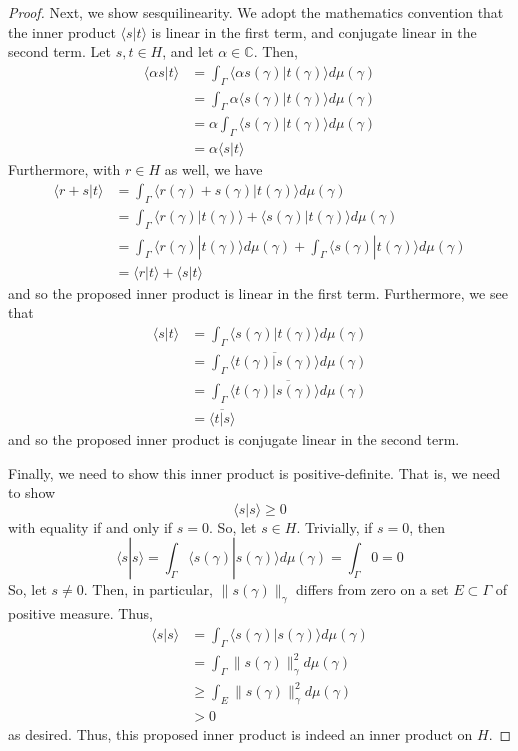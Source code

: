 \documentclass[fontsize=11pt]{scrartcl} %
\numberwithin{equation}{section} %
\numberwithin{figure}{section} %
\numberwithin{table}{section} %
\newcommand{\C}{\mathbb{C}}
\newcommand{\la}{\langle}
\newcommand{\ra}{\rangle}
\begin{document}
\begin{proof}
    Next, we show sesquilinearity. We adopt the mathematics convention that the
    inner product $\la s|t\ra$ is linear in the first term, and conjugate linear
    in the second term. Let $s,t\in H$, and let $\alpha\in \C$.
    Then,
    \[
        \begin{aligned}
        \la \alpha s|t\ra &= \int_{\Gamma}\la \alpha
        s(\gamma)|t(\gamma)\ra d\mu(\gamma)\\
        &= \int_{\Gamma}\alpha\la s(\gamma)|t(\gamma)\ra d\mu(\gamma)\\
        &= \alpha\int_{\Gamma}\la s(\gamma)|t(\gamma)\ra d\mu(\gamma)\\
        &=\alpha\la s|t\ra
    \end{aligned}
    \]
    Furthermore, with $r\in H$ as well, we have
    \[
\begin{aligned}
    \la r+s|t\ra &= \int_{\Gamma}\la r(\gamma)+s(\gamma)|t(\gamma)\ra
    d\mu(\gamma)\\
    &= \int_{\Gamma}\la r(\gamma)|t(\gamma)\ra + \la s(\gamma)|t(\gamma)\ra
    d\mu(\gamma)\\
    &=\int_{\Gamma}\la r(\gamma)|t(\gamma)\ra d\mu(\gamma) + \int_{\Gamma}\la
    s(\gamma)|t(\gamma)\ra d\mu(\gamma)\\
    &=\la r|t\ra + \la s|t\ra
\end{aligned}
    \]
    and so the proposed inner product is linear in the first term. Furthermore,
    we see that
    \[
\begin{aligned}
    \la s|t\ra &= \int_{\Gamma}\la s(\gamma)|t(\gamma)\ra d\mu(\gamma)\\
    &= \int_{\Gamma}\overline{\la t(\gamma)|s(\gamma)\ra} d\mu(\gamma)\\
    &= \overline{\int_{\Gamma}\la t(\gamma)|s(\gamma)\ra d\mu(\gamma)}\\
    &= \overline{\la t|s\ra}
\end{aligned}
    \]
    and so the proposed inner product is conjugate linear in the second term.

    Finally, we need to show this inner product is positive-definite. That is,
    we need to show
    \[
        \la s|s\ra \geq 0
    \]
    with equality if and only if $s=0$.
    So, let $s\in H$. Trivially, if $s=0$, then
    \[
        \la s|s\ra = \int_{\Gamma}\la s(\gamma)|s(\gamma)\ra d\mu(\gamma) =
        \int_{\Gamma}0 = 0
    \]
    So, let $s\neq 0$. Then, in particular, $\|s(\gamma)\|_{\gamma}$ differs
    from zero on a set $E\subset\Gamma$ of positive measure. Thus,
    \[
        \begin{aligned}
            \la s|s\ra &= \int_{\Gamma} \la s(\gamma)|s(\gamma)\ra
            d\mu(\gamma)\\
            &= \int_{\Gamma} \|s(\gamma)\|_{\gamma}^2 d\mu(\gamma)\\
            &\geq \int_E \|s(\gamma)\|_{\gamma}^2d\mu(\gamma)\\
            &> 0
    \end{aligned}
    \]
    as desired. Thus, this proposed inner product is indeed an inner product on
    $H$.


\end{proof}
\end{document}
